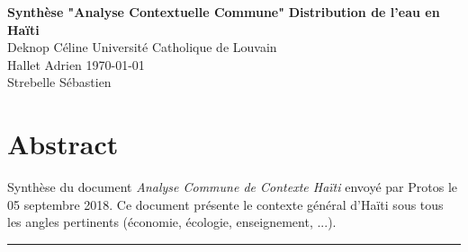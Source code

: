 \documentclass[a4paper, 11pt]{article}
\begin{document}
\noindent
\large\textbf{Synthèse "Analyse Contextuelle Commune"} \hfill \textbf{Distribution de l'eau en Haïti} \\
\normalsize Deknop Céline \hfill Université Catholique de Louvain \\
Hallet Adrien \hfill \today \\
Strebelle Sébastien

\section*{Abstract}
Synthèse du document \textit{Analyse Commune de Contexte Haïti} envoyé par Protos le 05 septembre 2018. Ce document présente le contexte général d'Haïti sous tous les angles pertinents (économie, écologie, enseignement, ...).
\hrule
\end{document}
